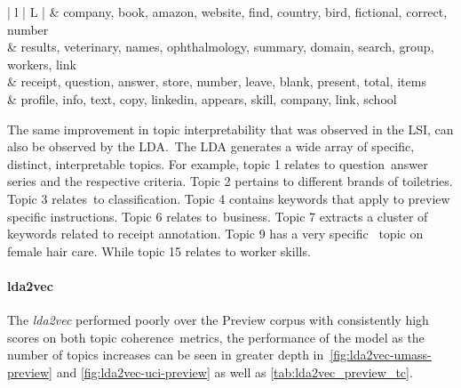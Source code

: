 \documentclass[letterpaper,12pt]{article}
\begin{document}
\begin{table}
\begin{center}
\begin{tabular}{| l | L |}
			 &                   company, book, amazon, website, find, country, bird, fictional, correct, number \\
			 &          results, veterinary, names, ophthalmology, summary, domain, search, group, workers, link \\
			 &                     receipt, question, answer, store, number, leave, blank, present, total, items \\
			 &                        profile, info, text, copy, linkedin, appears, skill, company, link, school \\
			\hline
		\end{tabular}
	\end{center}
\end{table}

The same improvement in topic interpretability that was observed in the LSI, can also be observed by the LDA.\
The LDA generates a wide array of specific, distinct, interpretable topics. For example, topic 1 relates to question\
answer series and the respective criteria. Topic 2 pertains to different brands of toiletries. Topic 3 relates\
to classification. Topic 4 contains keywords that apply to preview specific instructions. Topic 6 relates to\
business. Topic 7 extracts a cluster of keywords related to receipt annotation. Topic 9 has a very specific \
topic on female hair care. While topic 15 relates to worker skills.
\newpage

\paragraph{lda2vec}
The \emph{lda2vec} performed poorly over the Preview corpus with consistently high scores on both topic coherence\
metrics, the performance of the model as the number of topics increases can be seen in greater depth in\
\ref{fig:lda2vec-umass-preview} and \ref{fig:lda2vec-uci-preview} as well as \ref{tab:lda2vec_preview_tc}.
\end{document}
